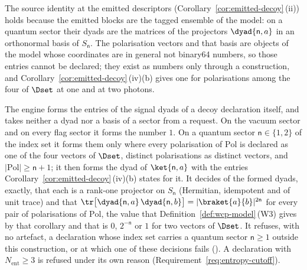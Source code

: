 
The source identity at the emitted descriptors
(Corollary~\ref{cor:emitted-decoy}\,(ii)) holds because the emitted blocks are
the tagged ensemble of the model: on a quantum sector their dyads are the
matrices of the projectors $\dyad{\mathsf{n},a}$ in an orthonormal basis of
$S_{\mathsf{n}}$. The polarisation vectors and that basis are objects of the
model whose coordinates are in general not binary64 numbers, so those entries
cannot be declared; they exist as numbers only through a construction, and
Corollary~\ref{cor:emitted-decoy}\,(iv)(b) gives one for polarisations among
the four of $\Dset$ at one and at two photons.

\begin{requirement}\label{req:signal-dyads}
The engine forms the entries of the signal dyads of a decoy declaration
itself, and takes neither a dyad nor a basis of a sector from a request. On
the vacuum sector and on every flag sector it forms the number $1$. On a
quantum sector $\mathsf{n}\in\{1,2\}$ of the index set it forms them only where
every polarisation of $\mathrm{Pol}$ is declared as one of the four vectors of
$\Dset$, distinct polarisations as distinct vectors, and
$|\mathrm{Pol}|\ge\mathsf{n}+1$; it then forms the dyad of $\ket{\mathsf{n},a}$
with the entries Corollary~\ref{cor:emitted-decoy}\,(iv)(b) states for it. It
decides of the formed dyads, exactly, that each is a rank-one projector on
$S_{\mathsf{n}}$ (Hermitian, idempotent and of unit trace) and that
$\tr\big[\dyad{\mathsf{n},a}\,\dyad{\mathsf{n},b}\big]
=|\braket{a}{b}|^{2\mathsf{n}}$ for every pair of polarisations of
$\mathrm{Pol}$, the value that Definition~\ref{def:wcp-model}\,(W3) gives by
that corollary and that is $0$, $2^{-\mathsf{n}}$ or $1$ for two vectors of
$\Dset$. It refuses, with no artefact, a declaration whose index set carries
a quantum sector $\mathsf{n}\ge1$ outside this construction, or at which one of
these decisions fails (). A
declaration with $N_{\mathrm{ent}}\ge3$ is refused under its own reason
(Requirement~\ref{req:entropy-cutoff}).
\end{requirement}
